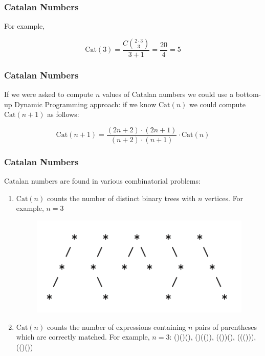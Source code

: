 \documentclass{beamer}
\begin{document}
\begin{frame}[fragile]
\frametitle{Catalan Numbers}

For example, 

\begin{equation*}
    \text{Cat}(3) = \frac{C\binom{2\cdot3}{3}}{3+1} = \frac{20}{4} = 5
\end{equation*}

\end{frame}

\begin{frame}[fragile]
\frametitle{Catalan Numbers}

If we were asked to compute $n$ values of Catalan numbers we could use a bottom-up Dynamic Programming approach: if we know $\text{Cat}(n)$ we could compute $\text{Cat}(n+1)$ as follows:

\begin{equation*}
    \text{Cat}(n+1) = \frac{(2n+2)\cdot(2n+1)}{(n+2)\cdot(n+1)}\cdot \text{Cat}(n)
\end{equation*}

\end{frame}

\begin{frame}[fragile]
\frametitle{Catalan Numbers}

Catalan numbers are found in various combinatorial problems:

\begin{enumerate}
    \item $\text{Cat}(n)$ counts the number of distinct binary trees with $n$ vertices. For example, $n=3$
    	\vspace{0.15cm}
    	\begin{figure}
		    \centering
		    \includegraphics[scale=0.7]{imgs/catalan_binary_trees.png}
		\end{figure}
    \item $\text{Cat}(n)$ counts the number of expressions containing $n$ pairs of parentheses which are correctly matched. For example, $n=3$: \color{red} ()()(), ()(()), (())(), ((())), (()())\color{black}
\end{enumerate}

\end{frame}
\end{document}

